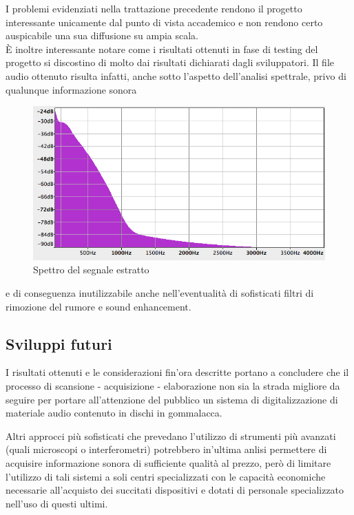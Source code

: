 I problemi evidenziati nella trattazione precedente rendono il progetto interessante unicamente dal punto di vista accademico e non rendono certo auspicabile una sua diffusione su ampia scala.\\
\`E inoltre interessante notare come i risultati ottenuti in fase di testing del progetto si discostino di molto dai risultati dichiarati dagli sviluppatori. Il file audio ottenuto risulta infatti, anche sotto l'aspetto dell'analisi spettrale, privo di qualunque informazione sonora
\begin{figure}[h!t]
\begin{center}
\includegraphics[scale=0.35]{./img/freq-domain.png}
\caption{Spettro del segnale estratto}
\end{center}
\end{figure}
 e di conseguenza inutilizzabile anche nell'eventualit\`a di sofisticati filtri di rimozione del rumore e sound enhancement.

\subsection{Sviluppi futuri}
I risultati ottenuti e le considerazioni fin'ora descritte portano a concludere che il processo di scansione - acquisizione - elaborazione non sia la strada migliore da seguire per portare all'attenzione del pubblico un sistema di digitalizzazione di materiale audio contenuto in dischi in gommalacca.

Altri approcci pi\`u sofisticati che prevedano l'utilizzo di strumenti pi\`u avanzati (quali microscopi o interferometri) potrebbero in'ultima anlisi permettere di acquisire informazione sonora di sufficiente qualit\`a al prezzo, per\`o di limitare l'utilizzo di tali sistemi a soli centri specializzati con le capacit\`a economiche necessarie all'acquisto dei succitati dispositivi e dotati di personale specializzato nell'uso di questi ultimi.
